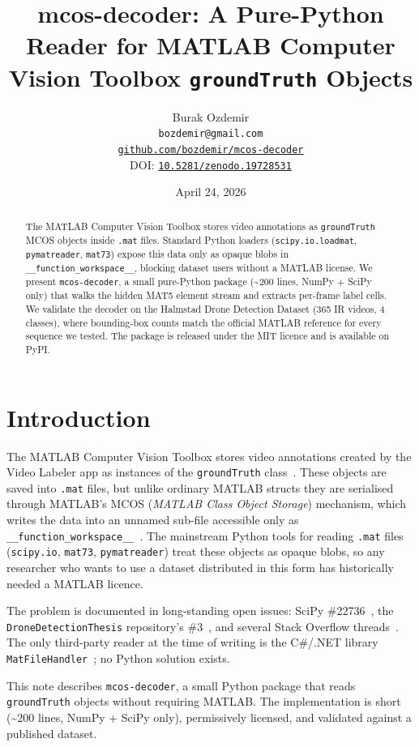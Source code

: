 \documentclass[10pt]{article}
\title{\textbf{mcos-decoder: A Pure-Python Reader for MATLAB Computer Vision Toolbox \texttt{groundTruth} Objects}}
\author{Burak Ozdemir\\
  \texttt{bozdemir@gmail.com} \\
  \href{https://github.com/bozdemir/mcos-decoder}{\texttt{github.com/bozdemir/mcos-decoder}} \\
  DOI: \href{https://doi.org/10.5281/zenodo.19728531}{\texttt{10.5281/zenodo.19728531}}}
\date{April 24, 2026}
\begin{document}
\maketitle

\begin{abstract}
The MATLAB Computer Vision Toolbox stores video annotations as
\texttt{groundTruth} MCOS objects inside \texttt{.mat} files. Standard
Python loaders (\texttt{scipy.io.loadmat}, \texttt{pymatreader},
\texttt{mat73}) expose this data only as opaque blobs in
\texttt{\_\_function\_workspace\_\_}, blocking dataset users without a
MATLAB license. We present \texttt{mcos-decoder}, a small pure-Python
package (\textasciitilde 200 lines, NumPy + SciPy only) that walks the
hidden MAT5 element stream and extracts per-frame label cells. We
validate the decoder on the Halmstad Drone Detection Dataset
(365 IR videos, 4 classes), where bounding-box counts match the official
MATLAB reference for every sequence we tested. The package is released
under the MIT licence and is available on PyPI.
\end{abstract}

\section{Introduction}

The MATLAB Computer Vision Toolbox stores video annotations created by
the Video Labeler app as instances of the
\texttt{groundTruth} class~\cite{matlabcv}. These objects are saved into
\texttt{.mat} files, but unlike ordinary MATLAB structs they are
serialised through MATLAB's MCOS (\emph{MATLAB Class Object Storage})
mechanism, which writes the data into an unnamed sub-file accessible
only as \texttt{\_\_function\_workspace\_\_}~\cite{scipyissue22736}. The
mainstream Python tools for reading \texttt{.mat} files
(\texttt{scipy.io}, \texttt{mat73}, \texttt{pymatreader}) treat these
objects as opaque blobs, so any researcher who wants to use a dataset
distributed in this form has historically needed a MATLAB licence.

The problem is documented in long-standing open issues: SciPy
\#22736~\cite{scipyissue22736}, the
\texttt{DroneDetectionThesis} repository's
\#3~\cite{droneissue3}, and several Stack
Overflow threads~\cite{somat}. The only third-party reader at the time
of writing is the C\#/.NET library
\texttt{MatFileHandler}~\cite{matfilehandler}; no Python solution exists.

This note describes \texttt{mcos-decoder}, a small Python package that
reads \texttt{groundTruth} objects without requiring MATLAB. The
implementation is short (\textasciitilde 200 lines, NumPy + SciPy only),
permissively licensed, and validated against a published dataset.
\end{document}
